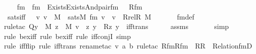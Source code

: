 \begin{isabellebody}
\ \ \isamarkupfalse%
\ fm\ \ {\isachardoublequoteopen}fm\ {\isasymequiv}\ Exists{\isacharparenleft}{\kern0pt}Exists{\isacharparenleft}{\kern0pt}And{\isacharparenleft}{\kern0pt}pair{\isacharunderscore}{\kern0pt}fm{\isacharparenleft}{\kern0pt}{}{\isacharcomma}{\kern0pt}\ {}{\isacharcomma}{\kern0pt}\ {}{\isacharparenright}{\kern0pt}{\isacharcomma}{\kern0pt}\ Rfm{\isacharparenright}{\kern0pt}{\isacharparenright}{\kern0pt}{\isacharparenright}{\kern0pt}{\isachardoublequoteclose}\isanewline
\ \ \isamarkupfalse%
\ sats{\isacharunderscore}{\kern0pt}iff\ {\isacharcolon}{\kern0pt}\ \ {\isachardoublequoteopen}{\isasymAnd}v{\isachardot}{\kern0pt}\ v\ {\isasymin}\ M\ {\isasymLongrightarrow}\ sats{\isacharparenleft}{\kern0pt}M{\isacharcomma}{\kern0pt}\ fm{\isacharcomma}{\kern0pt}\ {\isacharbrackleft}{\kern0pt}v{\isacharbrackright}{\kern0pt}{\isacharparenright}{\kern0pt}\ {\isasymlongleftrightarrow}\ v\ {\isasymin}\ Rrel{\isacharparenleft}{\kern0pt}R{\isacharcomma}{\kern0pt}\ M{\isacharparenright}{\kern0pt}{\isachardoublequoteclose}\ \isanewline
\ \ \ \ \isamarkupfalse%
\ fm{\isacharunderscore}{\kern0pt}def\ \isanewline
\ \ \ \ \isamarkupfalse%
{\isacharparenleft}{\kern0pt}rule{\isacharunderscore}{\kern0pt}tac\ Q{\isacharequal}{\kern0pt}{\isachardoublequoteopen}{\isasymexists}y\ {\isasymin}\ M{\isachardot}{\kern0pt}\ {\isasymexists}z\ {\isasymin}\ M{\isachardot}{\kern0pt}\ v\ {\isacharequal}{\kern0pt}\ {\isacharless}{\kern0pt}z{\isacharcomma}{\kern0pt}\ y{\isachargreater}{\kern0pt}\ {\isasymand}\ R{\isacharparenleft}{\kern0pt}z{\isacharcomma}{\kern0pt}\ y{\isacharparenright}{\kern0pt}{\isachardoublequoteclose}\ \ iff{\isacharunderscore}{\kern0pt}trans{\isacharparenright}{\kern0pt}\isanewline
\ \ \ \ \isamarkupfalse%
\ assms\ \isanewline
\ \ \ \ \isamarkupfalse%
\ simp\isanewline
\ \ \ \ \isamarkupfalse%
{\isacharparenleft}{\kern0pt}rule\ bex{\isacharunderscore}{\kern0pt}iff{\isacharcomma}{\kern0pt}\ rule\ bex{\isacharunderscore}{\kern0pt}iff{\isacharcomma}{\kern0pt}\ rule\ iff{\isacharunderscore}{\kern0pt}conjI{\isacharcomma}{\kern0pt}\ simp{\isacharparenright}{\kern0pt}\isanewline
\ \ \ \ \isamarkupfalse%
{\isacharparenleft}{\kern0pt}rule\ iff{\isacharunderscore}{\kern0pt}flip{\isacharcomma}{\kern0pt}\ rule\ iff{\isacharunderscore}{\kern0pt}trans{\isacharcomma}{\kern0pt}\ rename{\isacharunderscore}{\kern0pt}tac\ v\ a\ b{\isacharcomma}{\kern0pt}\ rule{\isacharunderscore}{\kern0pt}tac\ Rfm{\isacharequal}{\kern0pt}Rfm\ \ R{\isacharequal}{\kern0pt}R\ \ Relation{\isacharunderscore}{\kern0pt}fmD{\isacharparenright}{\kern0pt}\isanewline

\end{isabellebody}
